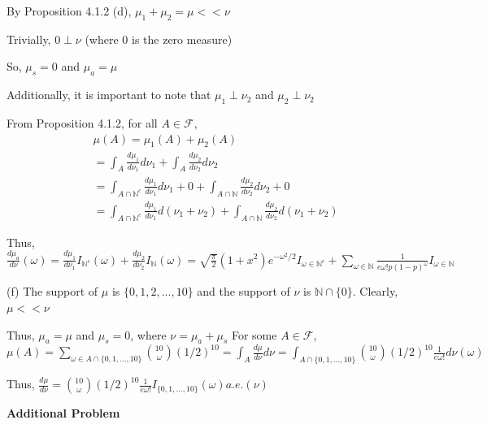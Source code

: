 \documentclass[12pt,letterpaper, onecolumn]{exam}
\newcommand{\nat}{\mathbb{N}}
\newcommand{\calF}{\mathcal{F}}
\begin{document}
\begin{questions}
\begin{solution}
    By Proposition 4.1.2 (d), $\mu_1 + \mu_2 = \mu << \nu$

    Trivially, $0 \perp \nu$ (where 0 is the zero measure)

    So, $\mu_s = 0$ and $\mu_a = \mu$

     Additionally, it is important to note that $\mu_1 \perp \nu_2$ and $\mu_2 \perp \nu_2$

    From Proposition 4.1.2, for all $A \in \calF$, 
    \begin{align*}
        & \mu(A) = \mu_1(A) + \mu_2(A) \\
        & = \int_A \frac{d\mu_1}{d\nu_1}d\nu_1 + \int_A \frac{d\mu_2}{d\nu_2}d\nu_2 \\
        & = \int_{A\cap \nat^c}  \frac{d\mu_1}{d\nu_1}d\nu_1 + 0 + \int_{A\cap \nat} \frac{d\mu_2}{d\nu_2}d\nu_2 + 0\\
        & = \int_{A\cap \nat^c}  \frac{d\mu_1}{d\nu_1}d(\nu_1 + \nu_2) + \int_{A\cap \nat} \frac{d\mu_2}{d\nu_2}d(\nu_1 + \nu_2)
    \end{align*}

    Thus, $\frac{d \mu_a}{d\nu}(\omega) = \frac{d \mu_1}{d\nu_1}I_{\nat^c}(\omega) +  \frac{d \mu_2}{d\nu_2}I_{\nat}(\omega) = \sqrt{\frac{\pi}{2}}(1 + x^2)e^{-\omega^2/2} I_{\omega \in \nat^c} + \sum_{\omega \in \nat} \frac{1}{e \omega! p(1-p)^\omega}I_{\omega \in \nat}$

    (f) The support of $\mu$ is $\{0, 1, 2, ... , 10\}$ and the support of $\nu$ is $\nat \cap \{0\}$. Clearly, $\mu << \nu$

    Thus, $\mu_a = \mu$ and $\mu_s = 0$, where $\nu = \mu_a + \mu_s$
    For some $A \in \calF$, \\
    $\mu(A) = \sum_{\omega \in A \cap \{0, 1, ... , 10\}} \binom{10}{\omega}(1/2)^{10} = \int_A \frac{d \mu}{d \nu}d\nu = \int_{A \cap \{0, 1, ... , 10\}} \binom{10}{\omega}(1/2)^{10} \frac{1}{e \omega!} d\nu(\omega)$

    Thus, $\frac{d \mu}{d \nu} = \binom{10}{\omega}(1/2)^{10} \frac{1}{e \omega!}I_{\{0, 1, ... , 10\}}(\omega) a.e.(\nu)$
    \end{solution}

    \question \textbf{Additional Problem}


\end{questions}
\end{document}
